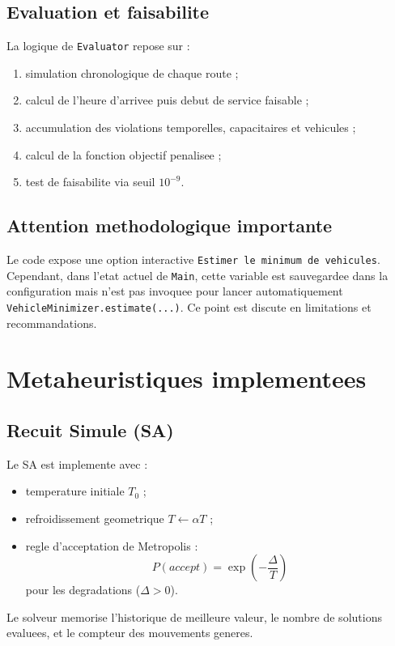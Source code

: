 \documentclass[12pt,a4paper]{report}
\begin{document}
\section{Evaluation et faisabilite}
La logique de \texttt{Evaluator} repose sur :
\begin{enumerate}
  \item simulation chronologique de chaque route ;
  \item calcul de l'heure d'arrivee puis debut de service faisable ;
  \item accumulation des violations temporelles, capacitaires et vehicules ;
  \item calcul de la fonction objectif penalisee ;
  \item test de faisabilite via seuil $10^{-9}$.
\end{enumerate}

\section{Attention methodologique importante}
Le code expose une option interactive \texttt{Estimer le minimum de vehicules}.
Cependant, dans l'etat actuel de \texttt{Main}, cette variable est sauvegardee dans la configuration
mais n'est pas invoquee pour lancer automatiquement \texttt{VehicleMinimizer.estimate(...)}.
Ce point est discute en limitations et recommandations.

\chapter{Metaheuristiques implementees}

\section{Recuit Simule (SA)}
Le SA est implemente avec :
\begin{itemize}[leftmargin=1.2cm]
  \item temperature initiale $T_0$ ;
  \item refroidissement geometrique $T \leftarrow \alpha T$ ;
  \item regle d'acceptation de Metropolis :
  \begin{equation}
  P(accept) = \exp\left(-\frac{\Delta}{T}\right)
  \end{equation}
  pour les degradations ($\Delta>0$).
\end{itemize}

Le solveur memorise l'historique de meilleure valeur, le nombre de solutions evaluees,
et le compteur des mouvements generes.
\end{document}
